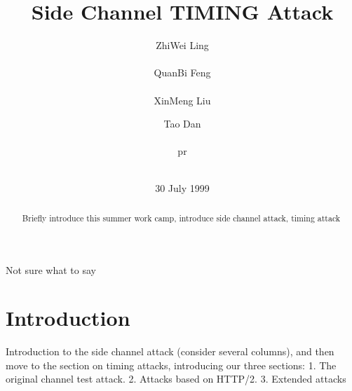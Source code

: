 \documentclass{acm_proc_article-sp}
\begin{document}
\title{Side Channel {\ttlit TIMING} Attack}

\author{
       \alignauthor
       ZhiWei Ling \\
       \\
       \alignauthor
       QuanBi Feng \\
       \\
       \alignauthor XinMeng Liu
       \\
       \and  %
       \alignauthor Tao Dan\\
       \\
       \alignauthor pr\\
       \\
}


\date{30 July 1999}

\maketitle
\begin{abstract}
       Briefly introduce this summer work camp, introduce side channel 
       attack, timing attack
\end{abstract}


\terms{}
Not sure what to say


\section{Introduction}
Introduction to the side channel attack (consider several columns), 
and then move to the section on timing attacks, introducing our 
three sections: 1. The original channel test attack. 2. Attacks 
based on HTTP/2. 3. Extended attacks
\end{document}

